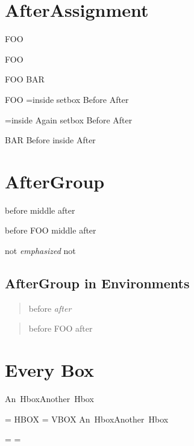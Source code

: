 \documentclass{article}
\def\foo{ FOO }
\def\bar{ BAR }
\begin{document}
\section{AfterAssignment}

{{{\afterassignment\foo}}}
\relax\the\mycounter
{}\relax\the\mycounter


{
\afterassignment\foo
{}\relax\the\mycounter
{}\relax\the\mycounter
}


{
\afterassignment\foo
\afterassignment\bar
{}\relax\the\mycounter
{}\relax\the\mycounter
}


\afterassignment\foo
\setbox\ABox=\hbox{inside}
setbox Before \copy\ABox After

\setbox\ABox=\hbox{inside}
Again setbox Before \copy\ABox After



\afterassignment\bar
Before \hbox{inside} After

\section{AfterGroup}
before { middle } after

before { \aftergroup\foo middle } after

not {\em emphasized} not

\subsection{AfterGroup in Environments}
\begin{quote}
before \em  after
\end{quote}

\begin{quote}
before \aftergroup\foo after
\end{quote}

\section{Every Box}

\def\HBox{ HBOX }
\def\VBox{ VBOX }

\vbox{\hbox{An Hbox}\hbox{Another Hbox}}

\everyhbox={\HBox}
\everyvbox={\VBox}
\vbox{\hbox{An Hbox}\hbox{Another Hbox}}

\everyhbox={}
\everyvbox={}




\end{document}
